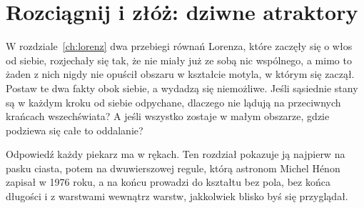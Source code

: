 
\chapter{Rozciągnij i złóż: dziwne atraktory}
\label{ch:strange}

\noindent
W rozdziale~\ref{ch:lorenz} dwa przebiegi równań Lorenza, które zaczęły się o
włos od siebie, rozjechały się tak, że nie miały już ze sobą nic wspólnego, a
mimo to żaden z nich nigdy nie opuścił obszaru w kształcie motyla, w którym
się zaczął. Postaw te dwa fakty obok siebie, a wydadzą się niemożliwe. Jeśli
sąsiednie stany są w każdym kroku od siebie odpychane, dlaczego nie lądują na
przeciwnych krańcach wszechświata? A jeśli wszystko zostaje w małym obszarze,
gdzie podziewa się całe to oddalanie?

Odpowiedź każdy piekarz ma w rękach. Ten rozdział pokazuje ją najpierw na
pasku ciasta, potem na dwuwierszowej regule, którą astronom Michel Hénon
zapisał w 1976 roku, a na końcu prowadzi do kształtu bez pola, bez końca
długości i z warstwami wewnątrz warstw, jakkolwiek blisko byś się przyglądał.

\begin{outcomes}
\end{outcomes}

